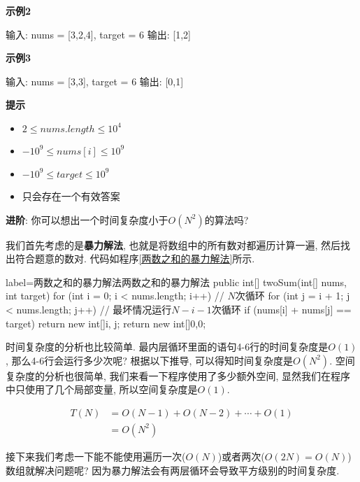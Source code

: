 \documentclass[oneside]{ctexbook}
\begin{document}
{\textbf{示例2}

\begin{mytext}
输入: nums = [3,2,4], target = 6
输出: [1,2]
\end{mytext}

\textbf{示例3}

\begin{mytext}
输入: nums = [3,3], target = 6
输出: [0,1]
\end{mytext}

\textbf{提示}

\begin{itemize}
    \item $2 \leq nums.length \leq 10^4$
    \item $-10^9 \leq nums[i] \leq 10^9$
    \item $-10^9 \leq target \leq 10^9$
    \item 只会存在一个有效答案
\end{itemize}

\textbf{进阶}: 你可以想出一个时间复杂度小于$O(N^2)$的算法吗?

我们首先考虑的是\textbf{暴力解法}, 也就是将数组中的所有数对都遍历计算一遍, 然后找出符合题意的数对. 代码如程序\ref{两数之和的暴力解法}所示.

\begin{myjava}{label={两数之和的暴力解法}}{两数之和的暴力解法}
public int[] twoSum(int[] nums, int target) {
    for (int i = 0; i < nums.length; i++) { // $N$次循环
        for (int j = i + 1; j < nums.length; j++) { // 最坏情况运行$N-i-1$次循环
            if (nums[i] + nums[j] == target) {
                return new int[]{i, j};
            }
        }
    }
    return new int[]{0,0};
}
\end{myjava}

时间复杂度的分析也比较简单. 最内层循环里面的语句4-6行的时间复杂度是$O(1)$, 那么4-6行会运行多少次呢? 根据以下推导, 可以得知时间复杂度是$O(N^2)$. 空间复杂度的分析也很简单, 我们来看一下程序使用了多少额外空间, 显然我们在程序中只使用了几个局部变量, 所以空间复杂度是$O(1)$.

\begin{equation*}
    \begin{split}
        T(N) &= O(N-1) + O(N-2) + \cdots + O(1) \\
             &= O(N^2)
    \end{split}
\end{equation*}

接下来我们考虑一下能不能使用遍历一次($O(N)$)或者两次($O(2N)=O(N)$)数组就解决问题呢? 因为暴力解法会有两层循环会导致平方级别的时间复杂度.

}
\end{document}
